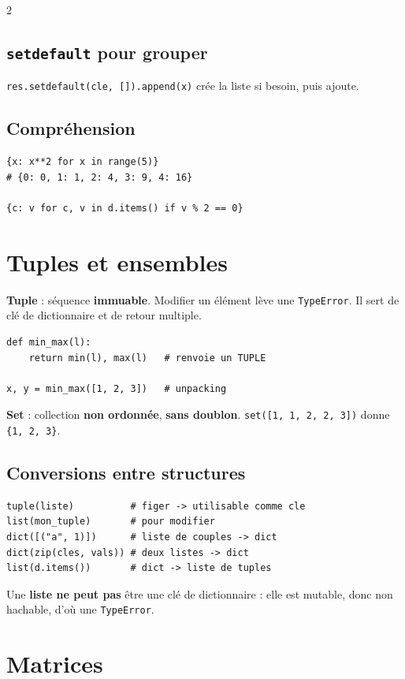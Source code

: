 \documentclass[a4paper,10pt]{article}
\newcommand{\co}[1]{\texttt{\textcolor{codefg}{#1}}}
\begin{document}
\begin{multicols}{2}
\subsection{\co{setdefault} pour grouper}
\co{res.setdefault(cle, []).append(x)} crée la liste si besoin, puis ajoute.

\subsection{Compréhension}
\begin{lstlisting}
{x: x**2 for x in range(5)}
# {0: 0, 1: 1, 2: 4, 3: 9, 4: 16}

{c: v for c, v in d.items() if v % 2 == 0}
\end{lstlisting}

\section{Tuples et ensembles}

\textbf{Tuple} : séquence \textbf{immuable}. Modifier un élément lève une
\co{TypeError}. Il sert de clé de dictionnaire et de retour multiple.

\begin{lstlisting}
def min_max(l):
    return min(l), max(l)   # renvoie un TUPLE

x, y = min_max([1, 2, 3])   # unpacking
\end{lstlisting}

\textbf{Set} : collection \textbf{non ordonnée}, \textbf{sans doublon}.
\co{set([1, 1, 2, 2, 3])} donne \co{\{1, 2, 3\}}.

\subsection{Conversions entre structures}
\begin{lstlisting}
tuple(liste)          # figer -> utilisable comme cle
list(mon_tuple)       # pour modifier
dict([("a", 1)])      # liste de couples -> dict
dict(zip(cles, vals)) # deux listes -> dict
list(d.items())       # dict -> liste de tuples
\end{lstlisting}

Une \textbf{liste ne peut pas} être une clé de dictionnaire : elle est mutable,
donc non hachable, d'où une \co{TypeError}.

\section{Matrices}


\end{multicols}
\end{document}
